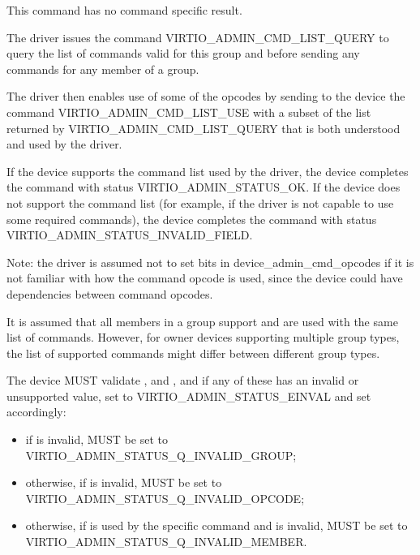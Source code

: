 This command has no command specific result.

The driver issues the command VIRTIO_ADMIN_CMD_LIST_QUERY to
query the list of commands valid for this group and before sending
any commands for any member of a group.

The driver then enables use of some of the opcodes by sending to
the device the command VIRTIO_ADMIN_CMD_LIST_USE with a subset
of the list returned by VIRTIO_ADMIN_CMD_LIST_QUERY that is
both understood and used by the driver.

If the device supports the command list used by the driver, the
device completes the command with status VIRTIO_ADMIN_STATUS_OK.
If the device does not support the command list
(for example, if the driver is not capable to use
some required commands), the device
completes the command with status
VIRTIO_ADMIN_STATUS_INVALID_FIELD.

Note: the driver is assumed not to set bits in
device_admin_cmd_opcodes
if it is not familiar with how the command opcode
is used, since the device could have dependencies between
command opcodes.

It is assumed that all members in a group support and are used
with the same list of commands. However, for owner devices
supporting multiple group types, the list of supported commands
might differ between different group types.


The device MUST validate ,  and
, and if any of these has an invalid or
unsupported value, set  to
VIRTIO_ADMIN_STATUS_EINVAL and set 
accordingly:
\begin{itemize}
\item if  is invalid, 
	MUST be set to VIRTIO_ADMIN_STATUS_Q_INVALID_GROUP;
\item otherwise, if  is invalid,
	 MUST be set to
	VIRTIO_ADMIN_STATUS_Q_INVALID_OPCODE;
\item otherwise, if  is used by the
	specific command and is invalid,  MUST be
	set to VIRTIO_ADMIN_STATUS_Q_INVALID_MEMBER.
\end{itemize}

